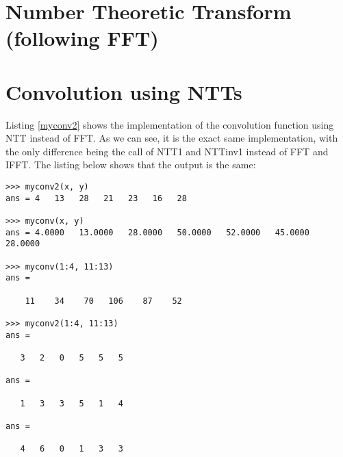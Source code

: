 \documentclass{article}
\begin{document}
\section{Number Theoretic Transform (following FFT)}


\section{Convolution using NTTs}
Listing \ref{myconv2} shows the implementation of the convolution function using NTT instead of FFT. As we can see, it is the exact same implementation, with the only difference being the call of NTT1 and NTTinv1 instead of FFT and IFFT. The listing below shows that the output is the same:

\begin{lstlisting}
>>> myconv2(x, y)
ans = 4   13   28   21   23   16   28

>>> myconv(x, y)
ans = 4.0000   13.0000   28.0000   50.0000   52.0000   45.0000   28.0000

>>> myconv(1:4, 11:13)
ans =

    11    34    70   106    87    52

>>> myconv2(1:4, 11:13)
ans =

   3   2   0   5   5   5

ans =

   1   3   3   5   1   4

ans =

   4   6   0   1   3   3
\end{lstlisting}


 
\end{document}
